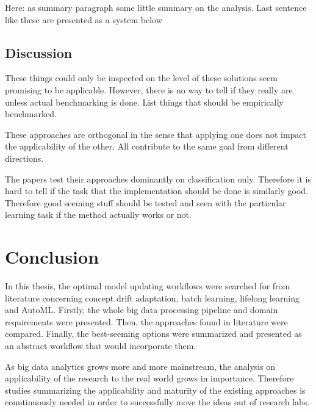

Here: as summary paragraph some little summary on the analysis. Last sentence like these are presented as a system below

\section{Discussion}

These things could only be inspected on the level of these solutions seem promising to be applicable. However, there is no way to tell if they really are unless actual benchmarking is done. List things that should be empirically benchmarked.

These approaches are orthogonal in the sense that applying one does not impact the applicability of the other. All contribute to the same goal from different directions.

The papers test their approaches dominantly on classification only. Therefore it is hard to tell if the task that the implementation should be done is similarly good. Therefore good seeming stuff should be tested and seen with the particular learning task if the method actually works or not.

\chapter{Conclusion}

In this thesis, the optimal model updating workflows were searched for from literature concerning concept drift adaptation, batch learning, lifelong learning and AutoML. Firstly, the whole big data processing pipeline and domain requirements were presented. Then, the approaches found in literature were compared. Finally, the best-seeming options were summarized and presented as an abstract workflow that would incorporate them.

As big data analytics grows more and more mainstream, the analysis on applicability of the research to the real world grows in importance. Therefore studies summarizing the applicability and maturity of the existing approaches is countinuously needed in order to successfully move the ideas out of research labs.


